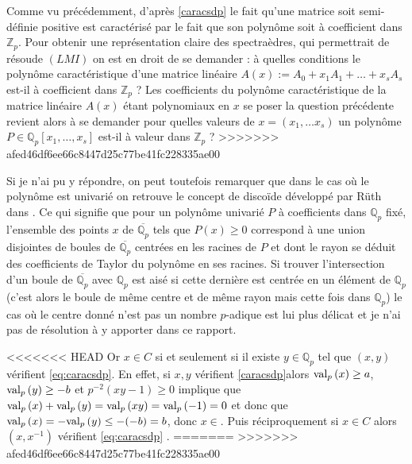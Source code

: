 Comme vu précédemment, d'après \ref{caracsdp} le fait qu'une matrice soit semi-définie positive est caractérisé par le fait que son polynôme soit à coefficient dans $\mathbb{Z}_p$. Pour obtenir une représentation claire des spectraèdres, qui permettrait de résoude $(LMI)$ on est en droit de se demander : à quelles conditions le polynôme caractéristique d'une matrice linéaire $A(x) := A_0 + x_1 A_1 + \ldots + x_s A_s$ est-il à coefficient dans $\mathbb{Z}_p$ ? 
Les coefficients du polynôme caractéristique de la matrice linéaire $A(x)$ étant polynomiaux en $x$ se poser la question précédente revient alors à se demander pour quelles valeurs de $x = (x_1,\ldots x_s)$ un polynôme $P \in \mathbb{Q}_{p} [x_1,\ldots,x_s]$ est-il à valeur dans $\mathbb{Z}_p$ ? 
>>>>>>> afed46df6ee66c8447d25c77be41fc228335ae00

Si je n'ai pu y répondre, on peut toutefois remarquer que dans le cas où le polynôme est univarié on retrouve le concept de discoïde développé par Rüth dans \cite{ruth_models_2015}. Ce qui signifie que pour un polynôme univarié $P$ à coefficients dans $\mathbb{Q}_{p}$ fixé, l'ensemble des points $x$ de $ \overline{\mathbb{Q}_{p} }$ tels que $P(x)\ge 0$ correspond à une union disjointes de boules de $\overline{\mathbb{Q}_{p} }$ centrées en les racines de $P$ et dont le rayon se déduit des coefficients de Taylor du polynôme en ses racines. Si trouver l'intersection d'un boule de $\overline{\mathbb{Q}_{p} }$ avec $\mathbb{Q}_{p}$ est aisé si cette dernière est centrée en un élément de $\mathbb{Q}_{p}$ (c'est alors le boule de même centre et de même rayon mais cette fois dans $\mathbb{Q}_{p}$) le cas où le centre donné n'est pas un nombre $p$-adique est lui plus délicat et je n'ai pas de résolution à y apporter dans ce rapport. 

<<<<<<< HEAD
Or $x \in C$ si et seulement si il existe $y \in \mathbb{Q}_{p} $ tel que $(x, y)$ vérifient \ref{eq:caracsdp}. En effet, si $x, y$ vérifient \ref{caracsdp}alors $\text{val}_p\left(x\right)\ge a$, $\text{val}_p\left(y\right)\ge -b$ et $p^{-2} \left( xy-1 \right) \ge 0$ implique que $\text{val}_p\left(x\right)+\text{val}_p\left(y\right)=\text{val}_p\left(xy\right) = \text{val}_p\left(-1\right) =0$ et donc que $\text{val}_p\left(x\right)=-\text{val}_p\left(y\right)\le -(-b)  =b$, donc $x \in $. Puis réciproquement si $x \in C$ alors $(x,x^{-1}) $ vérifient \ref{eq:caracsdp}  .
=======
>>>>>>> afed46df6ee66c8447d25c77be41fc228335ae00
